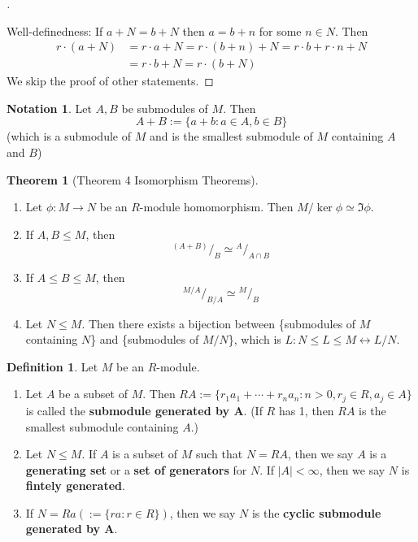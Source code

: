 \documentclass{article}
\theoremstyle{definition}
\newtheorem{thm}{Theorem}
\newtheorem{dfn}{Definition}
\newtheorem*{ntn}{Notation}
\newenvironment{proofs}[1][\proofname]{%
  \begin{proof}[#1]$ $\par\nobreak\ignorespaces
}{%
  \end{proof}
}
\newenvironment{thms}[1][\proofname]{%
  \begin{thm}[#1]$ $\par\nobreak\ignorespaces
}{%
  \end{thm}
}
\newcommand*\quot[2]{{^{\textstyle #1}\big/_{\textstyle #2}}}
\newcommand{\lra}{\leftrightarrow}
\begin{document}
\begin{proofs}
	Well-definedness:
	If $a + N = b + N$ then $a = b + n$ for some $n \in N$.
	Then
	\[
		\begin{split}
			r \cdot (a + N) &= r \cdot a + N = r \cdot (b + n) + N = r \cdot b + r \cdot n + N\\
			&= r \cdot b + N = r \cdot (b + N)
		\end{split}
	\]
	We skip the proof of other statements.
\end{proofs}

\begin{ntn}
	Let $A, B$ be submodules of $M$.
	Then 
	\[
		A + B:= \{a + b: a \in A, b \in B\}
	\]
	(which is a submodule of $M$ and is the smallest submodule of $M$ containing $A$ and $B$)
\end{ntn}

\begin{thms}[Theorem 4 Isomorphism Theorems]
	\begin{enumerate}
		\item[(1)] Let $\phi: M \to N$ be an $R$-module homomorphism.
			Then $M/\ker \phi \simeq \Im \phi$.

		\item[(2)] If $A, B \leq M$, then
			\[
				\quot{(A + B)}{B} \simeq \quot{A}{A \cap B}
			\]

		\item[(3)] If $A \leq B \leq M$, then
			\[
				\quot{M/A}{B/A} \simeq \quot{M}{B}
			\]

		\item[(4)] Let $N \leq M$.
			Then there exists a bijection between \{submodules of $M$ containing $N$\} and \{submodules of $M/N$\}, which is $L: N \leq L \leq M \lra L/N$.
	\end{enumerate}
\end{thms}

\begin{dfn}
	Let $M$ be an $R$-module.

	\begin{enumerate}
		\item[(1)] Let $A$ be a subset of $M$.
			Then $RA := \{r_1 a_1 + \cdots + r_n a_n: n > 0, r_j \in R, a_j \in A\}$ is called the \textbf{submodule generated by $\bm{A}$}.
			(If $R$ has 1, then $RA$ is the smallest submodule containing $A$.)

		\item[(2)] Let $N \leq M$.
			If $A$ is a subset of $M$ such that $N = RA$, then we say $A$ is a \textbf{generating set} or a \textbf{set of generators} for $N$.
			If $|A| < \infty$, then we say $N$ is \textbf{fintely generated}.

		\item[(3)] If $N = Ra (:= \{ra: r \in R\})$, then we say $N$ is the \textbf{cyclic submodule generated by $\bm{A}$}.
	\end{enumerate}
\end{dfn}
\end{document}
